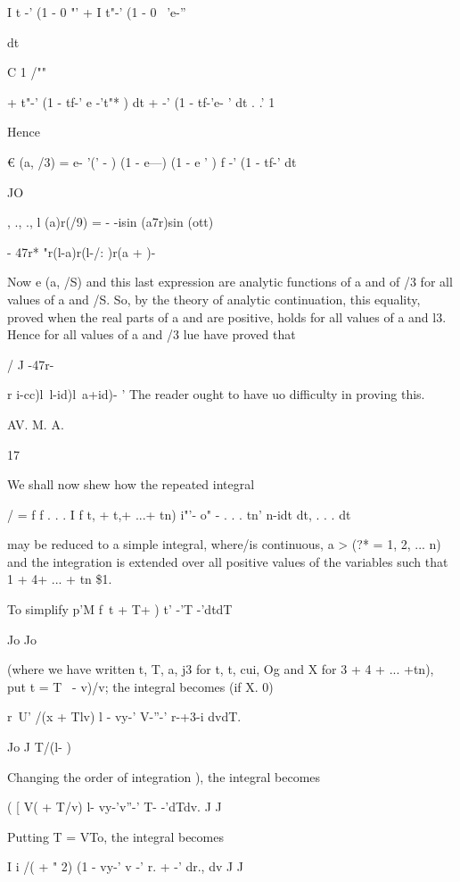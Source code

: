 I t -' (1 - 0 "' + I t"-' (1 - 0 ~'e-''

 dt

C 1 /""

+ t"-' (1 - tf-' e -'t"* ) dt + -' (1 - tf-'e- ' dt . .' 1

Hence

€ (a, /3) = e- '(' - ) (1 - e---) (1 - e ' ) f -' (1 - tf-' dt

JO

, ., ., l (a)r(/9) = - -isin (a7r)sin (ott) ~

- 47r* "r(l-a)r(l-/: )r(a + )-

Now e (a, /S) and this last expression are analytic functions of a and
of /3 for all values of a and /S. So, by the theory of analytic
continuation, this equality, proved when the real parts of a and are
positive, holds for all values of a and l3. Hence for all values of a
and /3 lue have proved that

/ J -47r-

r i-cc)l\ l-id)l\ a+id)- ' The reader ought to have uo difficulty in
proving this.

AV. M. A.

17

%
%


We shall now shew how the repeated integral

/ = f f . . . I f t, + t,+ ...+ tn) i"'- o" - . . . tn' n-idt dt, . .
. dt

may be reduced to a simple integral, where/is continuous, a > (?* = 1,
2, ... n) and the integration is extended over all positive values of
the variables such that 1 + 4+ ... + tn \$1.

To simplify p'M f\ t + T+ ) t' -'T -'dtdT

Jo Jo

(where we have written t, T, a, j3 for t, t, cui, Og and X for 3 + 4
+ ... +tn), put t = T \ - v)/v; the integral becomes (if X. 0)

r~U' /(x + Tlv) l - vy-' V-''-' r-+3-i dvdT.

Jo J T/(l- )

Changing the order of integration ), the integral becomes

( [ V( + T/v) l- vy-'v''-' T- -'dTdv. J J

Putting T = VTo, the integral becomes

I i /( + " 2) (1 - vy-' v -' r. + -' dr., dv J J

